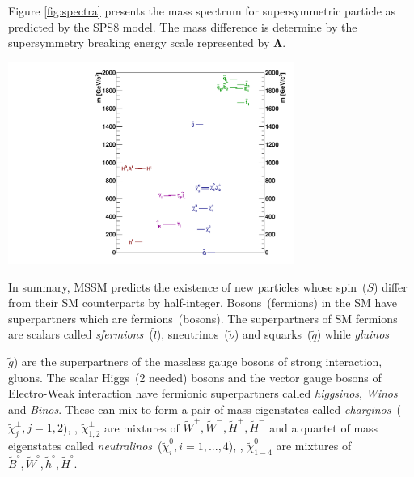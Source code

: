 {Figure \ref{fig:spectra} presents the mass spectrum for supersymmetric particle as predicted by the SPS8 model. The mass difference is determine by the supersymmetry breaking energy scale represented by $\mathbf{\Lambda}$.
\begin{center}
\centering
\includegraphics[height= 0.6\textwidth, width=0.7\textwidth]{THESISPLOTS/gmsb_Lambda180_CTau10000.pdf}  
\label{fig:spectra}
\end{center}

In summary, MSSM predicts the existence of new particles whose spin~($S$) differ from their SM counterparts by half-integer. Bosons~(fermions) in the SM have superpartners which are fermions~(bosons).
The superpartners of SM fermions are scalars called \textit{sfermions}~($\tilde{l}$), sneutrinos~($\tilde{\nu}$) and squarks~($\tilde{q}$) while \textit{gluinos}~{$\tilde{g}$) are the superpartners of the massless gauge bosons of strong interaction, gluons. The scalar Higgs~(2 needed) bosons and the vector gauge bosons of Electro-Weak interaction have fermionic superpartners called \textit{higgsinos}, \textit{Winos} and \textit{Binos}. These can mix to form a pair of mass eigenstates called \textit{charginos}~($\tilde{\chi}^{\pm}_{j}, j=1,2$), \ie,
$\tilde{\chi}^{\pm}_{1,2}$ are mixtures of $\tilde{W}^{+}, \tilde{W}^{-}, \tilde{H}^{+}, \tilde{H}^{-} $ and a quartet of mass  eigenstates called \textit{neutralinos}~($\tilde{\chi}^{0}_{i}, i=1,...,4$), \ie, $\tilde{\chi}^{0}_{1-4}$ are mixtures of $\tilde{B}^{\circ}, \tilde{W}^{\circ}, \tilde{h}^{\circ}, \tilde{H}^{\circ} $.

}}
